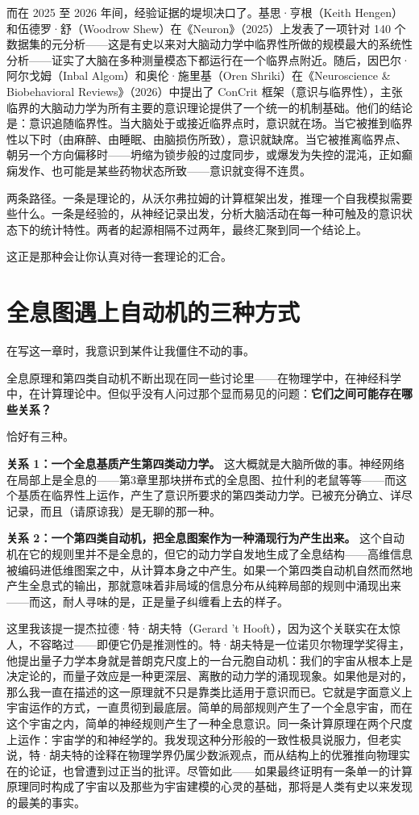 \documentclass[11pt, twoside, openright]{book}
\begin{document}
而在 2025 至 2026 年间，经验证据的堤坝决口了。基思·亨根（Keith Hengen）和伍德罗·舒（Woodrow Shew）在《Neuron》（2025）上发表了一项针对 140 个数据集的元分析------这是有史以来对大脑动力学中临界性所做的规模最大的系统性分析------证实了大脑在多种测量模态下都运行在一个临界点附近。随后，因巴尔·阿尔戈姆（Inbal Algom）和奥伦·施里基（Oren Shriki）在《Neuroscience \& Biobehavioral Reviews》（2026）中提出了 ConCrit 框架（意识与临界性），主张临界的大脑动力学为所有主要的意识理论提供了一个统一的机制基础。他们的结论是：意识追随临界性。当大脑处于或接近临界点时，意识就在场。当它被推到临界性以下时（由麻醉、由睡眠、由脑损伤所致），意识就缺席。当它被推离临界点、朝另一个方向偏移时------坍缩为锁步般的过度同步，或爆发为失控的混沌，正如癫痫发作、也可能是某些药物状态所致------意识就变得不连贯。

两条路径。一条是理论的，从沃尔弗拉姆的计算框架出发，推理一个自我模拟需要些什么。一条是经验的，从神经记录出发，分析大脑活动在每一种可触及的意识状态下的统计特性。两者的起源相隔不过两年，最终汇聚到同一个结论上。

这正是那种会让你认真对待一套理论的汇合。

\section*{全息图遇上自动机的三种方式}

在写这一章时，我意识到某件让我僵住不动的事。

全息原理和第四类自动机不断出现在同一些讨论里------在物理学中，在神经科学中，在计算理论中。但似乎没有人问过那个显而易见的问题：\textbf{它们之间可能存在哪些关系？}

恰好有三种。

\textbf{关系 1：一个全息基质产生第四类动力学。} 这大概就是大脑所做的事。神经网络在局部上是全息的------第3章里那块拼布式的全息图、拉什利的老鼠等等------而这个基质在临界性上运作，产生了意识所要求的第四类动力学。已被充分确立、详尽记录，而且（请原谅我）是无聊的那一种。

\textbf{关系 2：一个第四类自动机，把全息图案作为一种涌现行为产生出来。} 这个自动机在它的规则里并不是全息的，但它的动力学自发地生成了全息结构------高维信息被编码进低维图案之中，从计算本身之中产生。如果一个第四类自动机自然而然地产生全息式的输出，那就意味着非局域的信息分布从纯粹局部的规则中涌现出来------而这，耐人寻味的是，正是量子纠缠看上去的样子。

这里我该提一提杰拉德·特·胡夫特（Gerard 't Hooft），因为这个关联实在太惊人，不容略过------即便它仍是推测性的。特·胡夫特是一位诺贝尔物理学奖得主，他提出量子力学本身就是普朗克尺度上的一台元胞自动机：我们的宇宙从根本上是决定论的，而量子效应是一种更深层、离散的动力学的涌现现象。如果他是对的，那么我一直在描述的这一原理就不只是靠类比适用于意识而已。它就是字面意义上宇宙运作的方式，一直贯彻到最底层。简单的局部规则产生了一个全息宇宙，而在这个宇宙之内，简单的神经规则产生了一种全息意识。同一条计算原理在两个尺度上运作：宇宙学的和神经学的。我发现这种分形般的一致性极具说服力，但老实说，特·胡夫特的诠释在物理学界仍属少数派观点，而从结构上的优雅推向物理实在的论证，也曾遭到过正当的批评。尽管如此------如果最终证明有一条单一的计算原理同时构成了宇宙以及那些为宇宙建模的心灵的基础，那将是人类有史以来发现的最美的事实。
\end{document}
